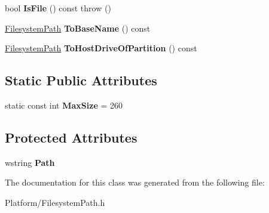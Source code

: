 \begin{DoxyCompactItemize}
bool {\bfseries Is\+File} () const  throw ()
\item 
\mbox{\label{class_gost_crypt_1_1_filesystem_path_ae9715b4599f781f1e84be00c4771d94e}} 
\hyperlink{class_gost_crypt_1_1_filesystem_path}{Filesystem\+Path} {\bfseries To\+Base\+Name} () const
\item 
\mbox{\label{class_gost_crypt_1_1_filesystem_path_af418ce0a78fd46ee084f6abea4784fc9}} 
\hyperlink{class_gost_crypt_1_1_filesystem_path}{Filesystem\+Path} {\bfseries To\+Host\+Drive\+Of\+Partition} () const
\end{DoxyCompactItemize}
\subsection*{Static Public Attributes}
\begin{DoxyCompactItemize}
\item 
\mbox{\label{class_gost_crypt_1_1_filesystem_path_a29a41ab9869ede135f94dd08b4c88d9c}} 
static const int {\bfseries Max\+Size} = 260
\end{DoxyCompactItemize}
\subsection*{Protected Attributes}
\begin{DoxyCompactItemize}
\item 
\mbox{\label{class_gost_crypt_1_1_filesystem_path_af78d33a6910178b833511394d87798ce}} 
wstring {\bfseries Path}
\end{DoxyCompactItemize}


The documentation for this class was generated from the following file\+:\begin{DoxyCompactItemize}
\item 
Platform/Filesystem\+Path.\+h\end{DoxyCompactItemize}
